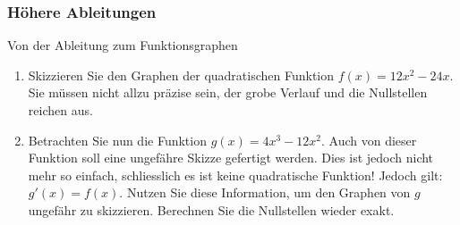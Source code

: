 \clearpage
\subsubsection{Höhere Ableitungen}
\begin{LA}
	{Von der Ableitung zum Funktionsgraphen}{}
	\begin{enumerate}
		\item Skizzieren Sie den Graphen der quadratischen Funktion $f(x)=12x^2-24x$. Sie müssen nicht allzu präzise sein, der grobe Verlauf und die Nullstellen reichen aus.

		      \begin{center}
		      \end{center}

		\item Betrachten Sie nun die Funktion $g(x)=4x^3-12x^2$. Auch von dieser Funktion soll eine ungefähre Skizze gefertigt werden. Dies ist jedoch nicht mehr so einfach, schliesslich es ist keine quadratische Funktion! Jedoch gilt: $g'(x)=f(x)$. Nutzen Sie diese Information, um den Graphen von $g$ ungefähr zu skizzieren. Berechnen Sie die Nullstellen wieder exakt.

		      \begin{center}
		      \end{center}
		      \pagebreak


\end{enumerate}
\end{LA}
